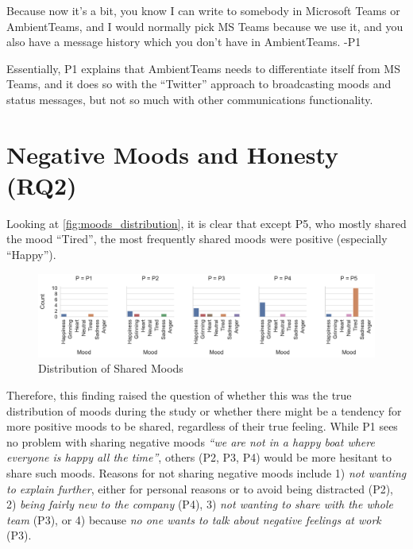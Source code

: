 \begin{displayquote}
    Because now it's a bit, you know I can write to somebody in Microsoft Teams or AmbientTeams, and I would normally pick MS Teams because we use it, and you also have a message history which you don't have in AmbientTeams. -P1
\end{displayquote}

Essentially, P1 explains that AmbientTeams needs to differentiate itself from MS Teams, and it does so with the \enquote{Twitter} approach to broadcasting moods and status messages, but not so much with other communications functionality.

\section{Negative Moods and Honesty (RQ2)}
\label{section:negative_moods_and_honesty}

Looking at \autoref{fig:moods_distribution}, it is clear that except P5, who mostly shared the mood \enquote{Tired}, the most frequently shared moods were positive (especially \enquote{Happy}).

\begin{figure}[h]
    \centering
    \includegraphics[width=\linewidth]{plots/moods_distribution.pdf}
    \caption{Distribution of Shared Moods}
    \label{fig:moods_distribution}
\end{figure}

Therefore, this finding raised the question of whether this was the true distribution of moods during the study or whether there might be a tendency for more positive moods to be shared, regardless of their true feeling. While P1 sees no problem with sharing negative moods \textit{\enquote{we are not in a happy boat where everyone is happy all the time}}, others (P2, P3, P4) would be more hesitant to share such moods. Reasons for not sharing negative moods include 1) \textit{not wanting to explain further}, either for personal reasons or to avoid being distracted (P2), 2) \textit{being fairly new to the company} (P4), 3) \textit{not wanting to share with the whole team} (P3), or 4) because \textit{no one wants to talk about negative feelings at work} (P3).

